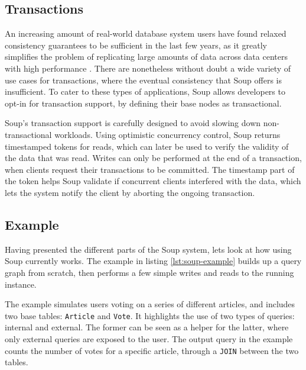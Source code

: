 \documentclass[b5paper]{report}
\begin{document}
\subsection{Transactions}
An increasing amount of real-world database system users have found relaxed
consistency guarantees to be sufficient in the last few years, as it greatly
simplifies the problem of replicating large amounts of data across data centers
with high performance \cite{existential}. There are nonetheless without doubt
a wide variety of use cases for transactions, where the eventual consistency that
Soup offers is insufficient. To cater to these types of applications, Soup
allows developers to opt-in for transaction support, by defining their base
nodes as transactional.

Soup's transaction support is carefully designed to avoid slowing down
non-transactional workloads. Using optimistic concurrency control, Soup returns
timestamped tokens for reads, which can later be used to verify the validity of
the data that was read. Writes can only be performed at the end of a
transaction, when clients request their transactions to be committed. The
timestamp part of the token helps Soup validate if concurrent clients
interfered with the data, which lets the system notify the client by aborting
the ongoing transaction.

\subsection{Example} \label{example}
Having presented the different parts of the Soup system, lets look at how using
Soup currently works. The example in listing \ref{lst:soup-example} builds up a query
graph from scratch, then performs a few simple writes and reads to the running
instance.

The example simulates users voting on a series of different articles, and
includes two base tables: \texttt{Article} and \texttt{Vote}. It highlights the
use of two types of queries: internal and external. The former can be seen as a
helper for the latter, where only external queries are exposed to the user. The
output query in the example counts the number of votes for a specific article,
through a \texttt{JOIN} between the two tables.
\end{document}
